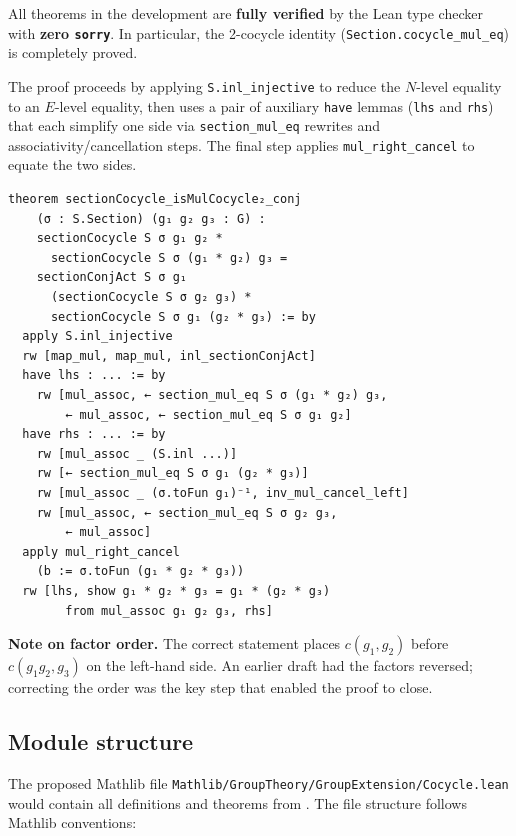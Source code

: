\documentclass[11pt]{article}
\begin{document}
All theorems in the development are \textbf{fully verified} by the Lean type checker
with \textbf{zero \texttt{sorry}}. In particular, the 2-cocycle identity
(\texttt{Section.cocycle\_mul\_eq}) is completely proved.

The proof proceeds by applying \texttt{S.inl\_injective} to reduce the $N$-level
equality to an $E$-level equality, then uses a pair of auxiliary \texttt{have} lemmas
(\texttt{lhs} and \texttt{rhs}) that each simplify one side via
\texttt{section\_mul\_eq} rewrites and associativity/cancellation steps. The final step
applies \texttt{mul\_right\_cancel} to equate the two sides.

\begin{lstlisting}
theorem sectionCocycle_isMulCocycle₂_conj
    (σ : S.Section) (g₁ g₂ g₃ : G) :
    sectionCocycle S σ g₁ g₂ *
      sectionCocycle S σ (g₁ * g₂) g₃ =
    sectionConjAct S σ g₁
      (sectionCocycle S σ g₂ g₃) *
      sectionCocycle S σ g₁ (g₂ * g₃) := by
  apply S.inl_injective
  rw [map_mul, map_mul, inl_sectionConjAct]
  have lhs : ... := by
    rw [mul_assoc, ← section_mul_eq S σ (g₁ * g₂) g₃,
        ← mul_assoc, ← section_mul_eq S σ g₁ g₂]
  have rhs : ... := by
    rw [mul_assoc _ (S.inl ...)]
    rw [← section_mul_eq S σ g₁ (g₂ * g₃)]
    rw [mul_assoc _ (σ.toFun g₁)⁻¹, inv_mul_cancel_left]
    rw [mul_assoc, ← section_mul_eq S σ g₂ g₃,
        ← mul_assoc]
  apply mul_right_cancel
    (b := σ.toFun (g₁ * g₂ * g₃))
  rw [lhs, show g₁ * g₂ * g₃ = g₁ * (g₂ * g₃)
        from mul_assoc g₁ g₂ g₃, rhs]
\end{lstlisting}

\textbf{Note on factor order.} The correct statement places $c(g_1, g_2)$ before
$c(g_1 g_2, g_3)$ on the left-hand side. An earlier draft had the factors reversed;
correcting the order was the key step that enabled the proof to close.

\subsection{Module structure}

The proposed Mathlib file \texttt{Mathlib/GroupTheory/GroupExtension/Cocycle.lean}
would contain all definitions and theorems from .
The file structure follows Mathlib conventions:
\end{document}
